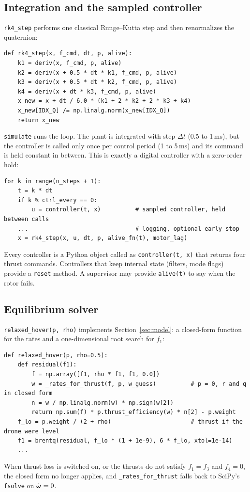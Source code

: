 \subsection{Integration and the sampled controller}
\texttt{rk4\_step} performs one classical Runge--Kutta step and then renormalizes the quaternion:
\begin{lstlisting}
def rk4_step(x, f_cmd, dt, p, alive):
    k1 = deriv(x, f_cmd, p, alive)
    k2 = deriv(x + 0.5 * dt * k1, f_cmd, p, alive)
    k3 = deriv(x + 0.5 * dt * k2, f_cmd, p, alive)
    k4 = deriv(x + dt * k3, f_cmd, p, alive)
    x_new = x + dt / 6.0 * (k1 + 2 * k2 + 2 * k3 + k4)
    x_new[IDX_Q] /= np.linalg.norm(x_new[IDX_Q])
    return x_new
\end{lstlisting}
\texttt{simulate} runs the loop. The plant is integrated with step $\Delta t$ (0.5 to 1\,ms), but the controller is called only once per control period (1 to 5\,ms) and its command is held constant in between. This is exactly a digital controller with a zero-order hold:
\begin{lstlisting}
for k in range(n_steps + 1):
    t = k * dt
    if k % ctrl_every == 0:
        u = controller(t, x)          # sampled controller, held between calls
    ...                               # logging, optional early stop
    x = rk4_step(x, u, dt, p, alive_fn(t), motor_lag)
\end{lstlisting}
Every controller is a Python object called as \texttt{controller(t, x)} that returns four thrust commands. Controllers that keep internal state (filters, mode flags) provide a \texttt{reset} method. A supervisor may provide \texttt{alive(t)} to say when the rotor fails.

\subsection{Equilibrium solver}
\texttt{relaxed\_hover(p, rho)} implements Section~\ref{sec:model}: a closed-form function for the rates and a one-dimensional root search for $f_1$:
\begin{lstlisting}
def relaxed_hover(p, rho=0.5):
    def residual(f1):
        f = np.array([f1, rho * f1, f1, 0.0])
        w = _rates_for_thrust(f, p, w_guess)          # p = 0, r and q in closed form
        n = w / np.linalg.norm(w) * np.sign(w[2])
        return np.sum(f) * p.thrust_efficiency(w) * n[2] - p.weight
    f_lo = p.weight / (2 + rho)                       # thrust if the drone were level
    f1 = brentq(residual, f_lo * (1 + 1e-9), 6 * f_lo, xtol=1e-14)
    ...
\end{lstlisting}
When thrust loss is switched on, or the thrusts do not satisfy $f_1 = f_3$ and $f_4 = 0$, the closed form no longer applies, and \texttt{\_rates\_for\_thrust} falls back to SciPy's \texttt{fsolve} on $\dot{\boldsymbol{\omega}}=0$.

